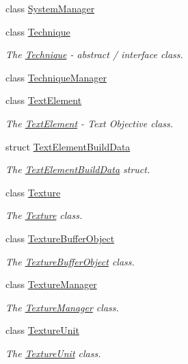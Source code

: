 \begin{DoxyCompactItemize}
class \hyperlink{classEngine_1_1SystemManager}{System\+Manager}
\item 
class \hyperlink{classEngine_1_1Technique}{Technique}
\begin{DoxyCompactList}\small\item\em The \hyperlink{classEngine_1_1Technique}{Technique} -\/ abstract / interface class. \end{DoxyCompactList}\item 
class \hyperlink{classEngine_1_1TechniqueManager}{Technique\+Manager}
\item 
class \hyperlink{classEngine_1_1TextElement}{Text\+Element}
\begin{DoxyCompactList}\small\item\em The \hyperlink{classEngine_1_1TextElement}{Text\+Element} -\/ Text Objective class. \end{DoxyCompactList}\item 
struct \hyperlink{structEngine_1_1TextElementBuildData}{Text\+Element\+Build\+Data}
\begin{DoxyCompactList}\small\item\em The \hyperlink{structEngine_1_1TextElementBuildData}{Text\+Element\+Build\+Data} struct. \end{DoxyCompactList}\item 
class \hyperlink{classEngine_1_1Texture}{Texture}
\begin{DoxyCompactList}\small\item\em The \hyperlink{classEngine_1_1Texture}{Texture} class. \end{DoxyCompactList}\item 
class \hyperlink{classEngine_1_1TextureBufferObject}{Texture\+Buffer\+Object}
\begin{DoxyCompactList}\small\item\em The \hyperlink{classEngine_1_1TextureBufferObject}{Texture\+Buffer\+Object} class. \end{DoxyCompactList}\item 
class \hyperlink{classEngine_1_1TextureManager}{Texture\+Manager}
\begin{DoxyCompactList}\small\item\em The \hyperlink{classEngine_1_1TextureManager}{Texture\+Manager} class. \end{DoxyCompactList}\item 
class \hyperlink{classEngine_1_1TextureUnit}{Texture\+Unit}
\begin{DoxyCompactList}\small\item\em The \hyperlink{classEngine_1_1TextureUnit}{Texture\+Unit} class. \end{DoxyCompactList}\item 

\end{DoxyCompactItemize}
